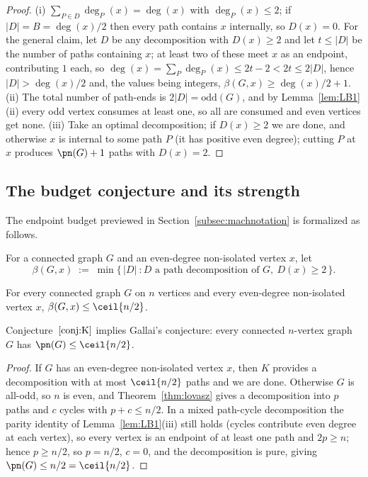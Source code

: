 \begin{proof}
(i) $\sum_{P\in D}\deg_P(x)=\deg(x)$ with $\deg_P(x)\le2$; if $|D|=B=\deg(x)/2$ then every
path contains $x$ internally, so $D(x)=0$. For the general claim, let $D$ be any decomposition
with $D(x)\ge2$ and let $t\le|D|$ be the number of paths containing $x$; at least two of these
meet $x$ as an endpoint, contributing $1$ each, so $\deg(x)=\sum_P\deg_P(x)\le 2t-2 < 2t \le
2|D|$, hence $|D|>\deg(x)/2$ and, the values being integers, $\beta(G,x)\ge\deg(x)/2+1$.
(ii) The total number of path-ends is $2|D|=\mathrm{odd}(G)$, and by Lemma~\ref{lem:LB1}(ii)
every odd vertex consumes at least one, so all are consumed and even vertices get none.
(iii) Take an optimal decomposition; if $D(x)\ge2$ we are done, and otherwise $x$ is internal
to some path $P$ (it has positive even degree); cutting $P$ at $x$ produces $\pn(G)+1$ paths
with $D(x)=2$.
\end{proof}

\subsection{The budget conjecture and its strength}\label{subsec:budgetK}

The endpoint budget previewed in Section~\ref{subsec:machnotation} is formalized as follows.

\begin{definition}\label{def:beta}
For a connected graph $G$ and an even-degree non-isolated vertex $x$, let
\[
\beta(G,x)\;:=\;\min\{\,|D|\ : D \text{ a path decomposition of } G,\ D(x)\ge2\,\}.
\]
\end{definition}

\begin{conjecture}[$K$]\label{conj:K}
For every connected graph $G$ on $n$ vertices and every even-degree non-isolated vertex $x$,
$\beta(G,x)\le\ceil{n/2}$.
\end{conjecture}

\begin{theorem}\label{thm:Kgallai}
Conjecture~$\ref{conj:K}$ implies Gallai's conjecture: every connected $n$-vertex graph $G$
has $\pn(G)\le\ceil{n/2}$.
\end{theorem}

\begin{proof}
If $G$ has an even-degree non-isolated vertex $x$, then $K$ provides a decomposition with at
most $\ceil{n/2}$ paths and we are done. Otherwise $G$ is all-odd, so $n$ is even, and
Theorem~\ref{thm:lovasz} gives a decomposition into $p$ paths and $c$ cycles with $p+c\le
n/2$. In a mixed path-cycle decomposition the parity identity of Lemma~\ref{lem:LB1}(iii)
still holds (cycles contribute even degree at each vertex), so every vertex is an endpoint of
at least one path and $2p\ge n$; hence $p\ge n/2$, so $p=n/2$, $c=0$, and the decomposition is
pure, giving $\pn(G)\le n/2=\ceil{n/2}$.
\end{proof}

